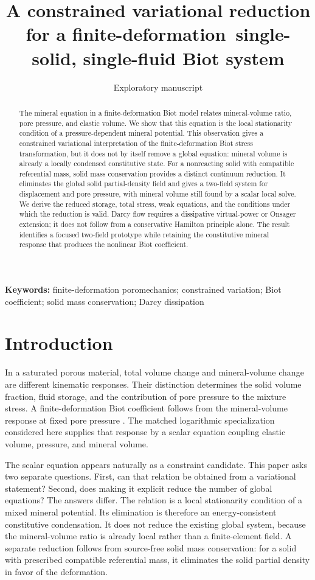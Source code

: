 \documentclass[11pt]{article}
\title{A constrained variational reduction for a finite-deformation\
single-solid, single-fluid Biot system}
\author{Exploratory manuscript}
\date{}
\begin{document}
\maketitle

\begin{abstract}
The mineral equation in a finite-deformation Biot model relates mineral-volume
ratio, pore pressure, and elastic volume.  We show that this equation is the
local stationarity condition of a pressure-dependent mineral potential.  This
observation gives a constrained variational interpretation of the
finite-deformation Biot stress transformation, but it does not by itself
remove a global equation: mineral volume is already a locally condensed
constitutive state.  For a nonreacting solid with compatible referential mass,
solid mass conservation provides a distinct continuum reduction.  It eliminates
the global solid partial-density field and gives a two-field system for
displacement and pore pressure, with mineral volume still found by a scalar
local solve.  We derive the reduced storage, total stress, weak equations,
and the conditions under which the reduction is valid.  Darcy flow requires
a dissipative virtual-power or Onsager extension; it does not follow from a
conservative Hamilton principle alone.  The result identifies a focused
two-field prototype while retaining the constitutive mineral response that
produces the nonlinear Biot coefficient.
\end{abstract}

\noindent\textbf{Keywords:} finite-deformation poromechanics; constrained
variation; Biot coefficient; solid mass conservation; Darcy dissipation

\section{Introduction}
\label{sec:introduction}

In a saturated porous material, total volume change and mineral-volume change
are different kinematic responses.  Their distinction determines the solid
volume fraction, fluid storage, and the contribution of pore pressure to the
mixture stress.  A finite-deformation Biot coefficient follows from the
mineral-volume response at fixed pore pressure \citep{fosterxu2025}.  The
matched logarithmic specialization considered here supplies that response by
a scalar equation coupling elastic volume, pressure, and mineral volume.

The scalar equation appears naturally as a constraint candidate.  This paper
asks two separate questions.  First, can that relation be obtained from a
variational statement?  Second, does making it explicit reduce the number of
global equations?  The answers differ.  The relation is a local stationarity
condition of a mixed mineral potential.  Its elimination is therefore an
energy-consistent constitutive condensation.  It does not reduce the existing
global system, because the mineral-volume ratio is already local rather than
a finite-element field.  A separate reduction follows from source-free solid
mass conservation: for a solid with prescribed compatible referential mass, it eliminates
the solid partial density in favor of the deformation.
\end{document}
